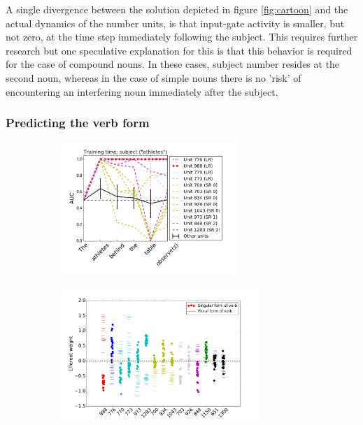 A single divergence between the solution depicted in figure \ref{fig:cartoon} and the actual dynamics of the number units, is that input-gate activity is smaller, but not zero, at the time step immediately following the subject. This requires further research but one speculative explanation for this is that this behavior is required for the case of compound nouns. In these cases, subject number resides at the second noun, whereas in the case of simple nouns there is no 'risk' of encountering an interfering noun immediately after the subject. 

\subsubsection{Predicting the verb form}\label{subsec:output-weight}
\begin{figure}[t!]
    \centering
    \begin{subfigure}{0.45\textwidth}
            \centering
            \includegraphics[height=5cm]{Figures/GAT1d_cell_nounpp_SR_LR_single_unit.png}
            \label{fig:GAT}
    \end{subfigure}
    \begin{subfigure}{0.45\textwidth}
            \centering
            \includegraphics[height=5cm]{Figures/Figure5_output_weights.png}
            \label{fig:output-weights}
    \end{subfigure}
    
\end{figure}

